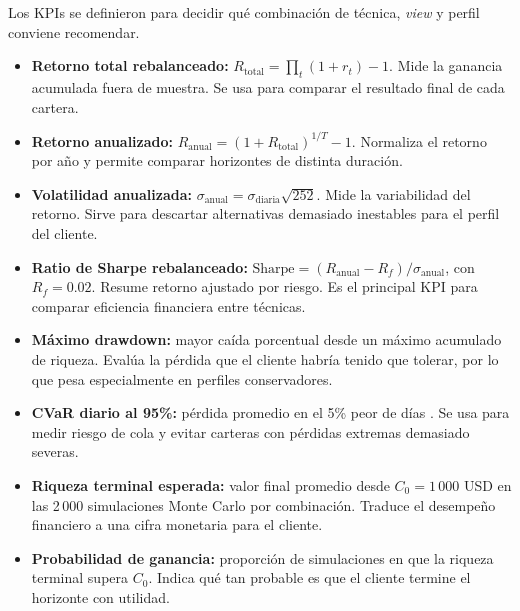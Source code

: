 Los KPIs se definieron para decidir qu\'e combinaci\'on de t\'ecnica,
\textit{view} y perfil conviene recomendar. 

\begin{itemize}
    \item \textbf{Retorno total rebalanceado:}
    $R_{\text{total}} = \prod_t (1 + r_t) - 1$. Mide la ganancia acumulada
    fuera de muestra. Se usa para comparar el resultado final de cada cartera.

    \item \textbf{Retorno anualizado:}
    $R_{\text{anual}} = (1 + R_{\text{total}})^{1/T} - 1$. Normaliza el retorno
    por a\~no y permite comparar horizontes de distinta duraci\'on.

    \item \textbf{Volatilidad anualizada:}
    $\sigma_{\text{anual}} = \sigma_{\text{diaria}}\sqrt{252}$. Mide la
    variabilidad del retorno. Sirve para descartar alternativas demasiado
    inestables para el perfil del cliente.

    \item \textbf{Ratio de Sharpe rebalanceado:}
    $\text{Sharpe} = (R_{\text{anual}} - R_f)/\sigma_{\text{anual}}$, con
    $R_f = 0.02$. Resume retorno ajustado por riesgo. Es el principal KPI para
    comparar eficiencia financiera entre t\'ecnicas.

    \item \textbf{M\'aximo drawdown:} mayor ca\'ida porcentual desde un m\'aximo
    acumulado de riqueza. Eval\'ua la p\'erdida que el cliente habr\'ia tenido
    que tolerar, por lo que pesa especialmente en perfiles conservadores.

    \item \textbf{CVaR diario al 95\%:} p\'erdida promedio en el 5\% peor de
    d\'ias \cite{rockafellar2000}. Se usa para medir riesgo de cola y evitar
    carteras con p\'erdidas extremas demasiado severas.

    \item \textbf{Riqueza terminal esperada:} valor final promedio desde
    $C_0 = 1\,000$ USD en las 2\,000 simulaciones Monte Carlo por combinaci\'on. Traduce el
    desempe\~no financiero a una cifra monetaria para el cliente.

    \item \textbf{Probabilidad de ganancia:} proporci\'on de simulaciones en
    que la riqueza terminal supera $C_0$. Indica qu\'e tan probable es que el
    cliente termine el horizonte con utilidad.


\end{itemize}
